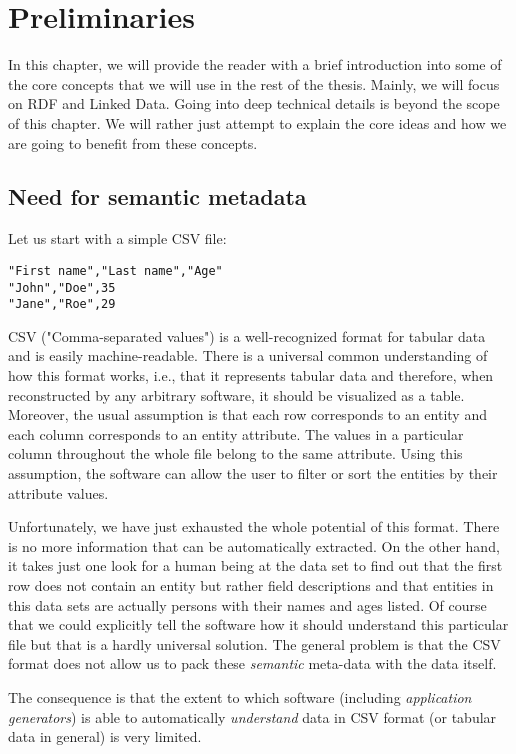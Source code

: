 \chapter{Preliminaries}

In this chapter, we will provide the reader with a brief introduction into some of the core concepts that we will use in the rest of the thesis. Mainly, we will focus on RDF and Linked Data. Going into deep technical details is beyond the scope of this chapter. We will rather just attempt to explain the core ideas and how we are going to benefit from these concepts.

\section{Need for semantic metadata}

Let us start with a simple CSV file:

\begin{verbatim}
"First name","Last name","Age"
"John","Doe",35
"Jane","Roe",29
\end{verbatim}

CSV ("Comma-separated values") \cite{csv} is a well-recognized format for tabular data and is easily machine-readable. There is a universal common understanding of how this format works, i.e., that it represents tabular data and therefore, when reconstructed by any arbitrary software, it should be visualized as a table. Moreover, the usual assumption is that each row corresponds to an entity and each column corresponds to an entity attribute. The values in a particular column throughout the whole file belong to the same attribute. Using this assumption, the software can allow the user to filter or sort the entities by their attribute values.

Unfortunately, we have just exhausted the whole potential of this format. There is no more information that can be automatically extracted. On the other hand, it takes just one look for a human being at the data set to find out that the first row does not contain an entity but rather field descriptions and that entities in this data sets are actually persons with their names and ages listed. Of course that we could explicitly tell the software how it should understand this particular file but that is a hardly universal solution. The general problem is that the CSV format does not allow us to pack these \emph{semantic} meta-data with the data itself.

The consequence is that the extent to which software (including \emph{application generators}) is able to automatically \emph{understand} data in CSV format (or tabular data in general) is very limited.

